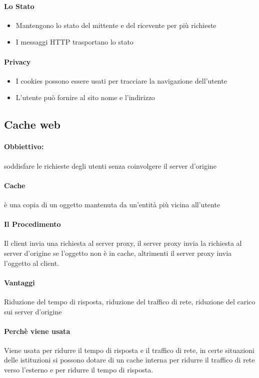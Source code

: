             \paragraph{Lo Stato}
                \begin{itemize}
                    \item Mantengono lo stato del mittente e del ricevente per più richieste
                    \item I messaggi HTTP trasportano lo stato
                \end{itemize}
            \paragraph{Privacy}
                \begin{itemize}
                    \item I cookies possono essere usati per tracciare la navigazione dell'utente
                    \item L'utente può fornire al sito nome e l'indirizzo
                \end{itemize}
    \subsection{Cache web}
        \paragraph{Obbiettivo:} soddisfare le richieste degli utenti senza coinvolgere il server d'origine
        \paragraph{Cache} è una copia di un oggetto mantenuta da un'entità più vicina all'utente
        \paragraph{Il Procedimento} Il client invia una richiesta al server proxy, il server proxy invia la richiesta al server d'origine se l'oggetto non è in cache, altrimenti il server proxy invia l'oggetto al client.
        \paragraph{Vantaggi} Riduzione del tempo di risposta, riduzione del traffico di rete, riduzione del carico sui server d'origine
        \paragraph{Perchè viene usata} Viene usata per ridurre il tempo di risposta e il traffico di rete, in certe situazioni delle istituzioni si possono dotare di un cache interna per ridurre il traffico di rete verso l'esterno e per ridurre il tempo di risposta.
